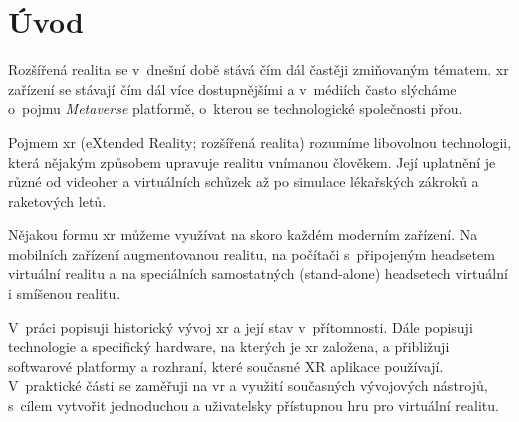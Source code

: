 \chapter*{Úvod}
Rozšířená realita se v~dnešní době stává čím dál častěji zmiňovaným tématem. \gls{xr} zařízení se stávají čím dál více dostupnějšími a v~médiích často slýcháme o~pojmu \textit{Metaverse} \poml platformě, o~kterou se technologické společnosti přou.

Pojmem \gls{xr} (eXtended Reality; rozšířená realita) rozumíme libovolnou technologii, která nějakým způsobem upravuje realitu vnímanou člověkem. Její uplatnění je různé \poml od videoher a virtuálních schůzek až po simulace lékařských zákroků a raketových letů. \cite{muni_kybernetika}

Nějakou formu \gls{xr} můžeme využívat na skoro každém moderním zařízení. Na mobilních zařízení augmentovanou realitu, na počítači s~připojeným headsetem virtuální realitu a na speciálních samostatných (stand-alone) headsetech virtuální i smíšenou realitu.

V~práci popisuji historický vývoj \gls{xr} a její stav v~přítomnosti. Dále popisuji technologie a specifický hardware, na kterých je \gls{xr} založena, a přibližuji softwarové platformy a rozhraní, které současné XR aplikace používají. V~praktické části se zaměřuji na \gls{vr} a využití současných vývojových nástrojů, s~cílem vytvořit jednoduchou a uživatelsky přístupnou hru pro virtuální realitu.